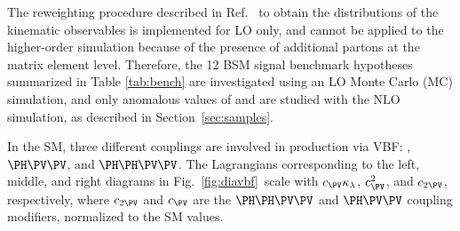 \documentclass[11pt,twoside,a4paper,cmspaper,final,collab]{cms-tdr}
\begin{document}
The reweighting procedure described in Ref.~\cite{Dall'Osso:2015aia} to obtain the distributions of the kinematic observables is implemented for LO only, and cannot be applied to the higher-order simulation because of the presence of additional partons at the matrix element level. Therefore, the 12 BSM signal benchmark hypotheses summarized in Table \ref{tab:bench} are investigated using an LO Monte Carlo (MC) simulation, and only anomalous values of \kapl and \kapt are studied with the NLO simulation, as described in Section~\ref{sec:samples}.


\begin{table}[h]
  \centering
{}
\end{table}

In the SM, three different couplings are
involved in \HH production via VBF: \lbdHHH, $\HVV$, and $\HHVV$.
The Lagrangians corresponding to the left, middle, and right diagrams in Fig.~\ref{fig:diavbf}~scale with $\conev\kapl$, $\conev^2$, and $\ctwov$, respectively, where $\ctwov$ and $\conev$ are the $\HHVV$ and $\HVV$ coupling modifiers, normalized to the SM values. 
\end{document}
